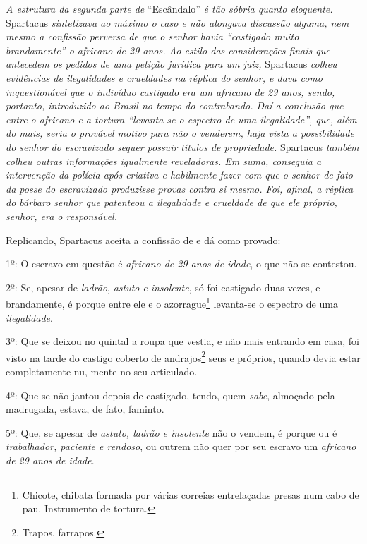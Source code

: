 \begin{didascalia}
\emph{A estrutura da segunda parte de} ``Escândalo'' \emph{é tão sóbria
quanto eloquente.} Spartacus \emph{sintetizava ao máximo o caso e não
alongava discussão alguma, nem mesmo a confissão perversa de que o
senhor havia ``castigado muito brandamente'' o africano de 29 anos. Ao
estilo das considerações finais que antecedem os pedidos de uma petição
jurídica para um juiz,} Spartacus \emph{colheu evidências de
ilegalidades e crueldades na réplica do senhor, e dava como
inquestionável que o indivíduo castigado era um africano de 29 anos,
sendo, portanto, introduzido ao Brasil no tempo do contrabando. Daí a
conclusão que entre o africano e a tortura ``levanta-se o espectro de uma
ilegalidade'', que, além do mais, seria o provável motivo para não o
venderem, haja vista a possibilidade do senhor do escravizado sequer
possuir títulos de propriedade.} Spartacus \emph{também colheu outras
informações igualmente reveladoras. Em suma, conseguia a intervenção da
polícia após criativa e habilmente fazer com que o senhor de fato da
posse do escravizado produzisse provas contra si mesmo. Foi, afinal, a
réplica do bárbaro senhor que patenteou a ilegalidade e crueldade de que
ele próprio, senhor, era o responsável.}
\end{didascalia}


Replicando, Spartacus aceita a confissão de \asterisc{} e dá como provado:

1º: O escravo em questão é \emph{africano de 29 anos de idade}, o que
não se contestou.

2º: Se, apesar de \emph{ladrão}, \emph{astuto} \emph{e insolente}, só
foi castigado duas vezes, e brandamente, é porque entre ele e o
azorrague\footnote{ Chicote, chibata formada por várias correias
  entrelaçadas presas num cabo de pau. Instrumento de tortura.}
levanta-se o espectro de uma \emph{ilegalidade}.

3º: Que se deixou no quintal a roupa que vestia, e não mais entrando em
casa, foi visto na tarde do castigo coberto de andrajos\footnote{
  Trapos, farrapos.} seus e próprios, quando devia estar completamente
nu, mente \asterisc{} no seu articulado.

4º: Que se não jantou depois de castigado, tendo, quem \emph{sabe},
almoçado pela madrugada, estava, de fato, faminto.

5º: Que, se apesar de \emph{astuto, ladrão e insolente} não o vendem, é
porque ou é \emph{trabalhador, paciente e rendoso}, ou outrem não quer
por seu escravo um \emph{africano de 29 anos de idade}.

